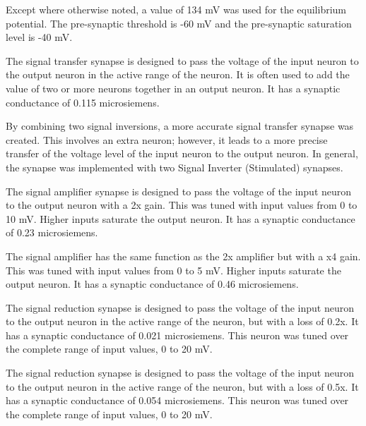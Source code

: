 
Except where otherwise noted, a value of 134 mV was used for the equilibrium
potential. The pre-synaptic threshold is -60 mV and the pre-synaptic saturation
level is -40 mV.


The signal transfer synapse is designed to pass the voltage of the input neuron
to the output neuron in the active range of the neuron. It is often used to add
the value of two or more neurons together in an output neuron.
It has a synaptic 
conductance of 0.115 microsiemens. 


By combining two signal inversions, a more accurate signal transfer synapse was
created. This involves an extra neuron; however, it leads to a more precise
transfer of the voltage level of the input neuron to the output neuron. In
general, the synapse was implemented with two Signal Inverter (Stimulated)
synapses.


The signal amplifier synapse is designed to pass the voltage of the input neuron
to the output neuron with a 2x gain. This was tuned with input values from 0 to
10 mV. Higher inputs saturate the output neuron. It has a synaptic conductance
of 0.23 microsiemens.


The signal amplifier has the same function as the 2x amplifier but with a x4 
gain. This was tuned with input values from 0 to
5 mV. Higher inputs saturate the output neuron. It has a synaptic conductance
of 0.46 microsiemens.


The signal reduction synapse is designed to pass the voltage of the input neuron
to the output neuron in the active range of the neuron, but with a loss of 0.2x. 
It has a synaptic  conductance of 0.021 microsiemens. This neuron was tuned
over the complete range of input values, 0 to 20 mV.


The signal reduction synapse is designed to pass the voltage of the input neuron
to the output neuron in the active range of the neuron, but with a loss of 0.5x. 
It has a synaptic  conductance of 0.054 microsiemens. This neuron was tuned
over the complete range of input values, 0 to 20 mV.

